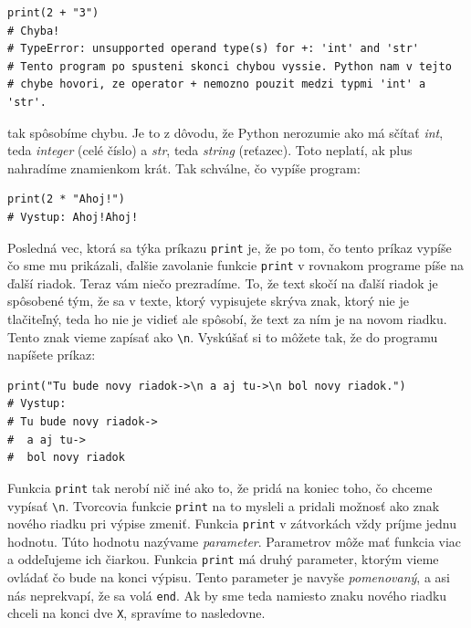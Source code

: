 \documentclass{article}
\begin{document}
\begin{lstlisting}
print(2 + "3")
# Chyba! 
# TypeError: unsupported operand type(s) for +: 'int' and 'str'
# Tento program po spusteni skonci chybou vyssie. Python nam v tejto
# chybe hovori, ze operator + nemozno pouzit medzi typmi 'int' a 'str'.
\end{lstlisting}

tak spôsobíme chybu. Je to z dôvodu, že Python nerozumie ako má sčítať \textit{int}, teda \textit{integer} (celé číslo) a \textit{str}, teda \textit{string} (reťazec). Toto neplatí, ak plus nahradíme znamienkom krát. Tak schválne, čo vypíše program:

\begin{lstlisting}
print(2 * "Ahoj!")
# Vystup: Ahoj!Ahoj!
\end{lstlisting}

Posledná vec, ktorá sa týka príkazu \texttt{print} je, že po tom, čo tento príkaz vypíše čo sme mu prikázali, ďalšie zavolanie funkcie \texttt{print} v rovnakom programe píše na ďalší riadok. Teraz vám niečo prezradíme. To, že text skočí na ďalší riadok je spôsobené tým, že sa v texte, ktorý vypisujete skrýva znak, ktorý nie je tlačiteľný, teda ho nie je vidieť ale spôsobí, že text za ním je na novom riadku. Tento znak vieme zapísať ako \texttt{\textbackslash n}. Vyskúšať si to môžete tak, že do programu napíšete príkaz:

\begin{lstlisting}
print("Tu bude novy riadok->\n a aj tu->\n bol novy riadok.")
# Vystup:
# Tu bude novy riadok->
#  a aj tu->
#  bol novy riadok
\end{lstlisting}


Funkcia \texttt{print} tak nerobí nič iné ako to, že pridá na koniec toho, čo chceme vypísať \texttt{\textbackslash n}. Tvorcovia funkcie \texttt{print} na to mysleli a pridali možnosť ako znak nového riadku pri výpise zmeniť. Funkcia \texttt{print} v zátvorkách vždy príjme jednu hodnotu. Túto hodnotu nazývame \textit{parameter}. Parametrov môže mať funkcia viac a oddeľujeme ich čiarkou. Funkcia \texttt{print} má druhý parameter, ktorým vieme ovládať čo bude na konci výpisu. Tento parameter je navyše \textit{pomenovaný}, a asi nás neprekvapí, že sa volá \texttt{end}. Ak by sme teda namiesto znaku nového riadku chceli na konci dve \texttt{X}, spravíme to nasledovne.
\end{document}
